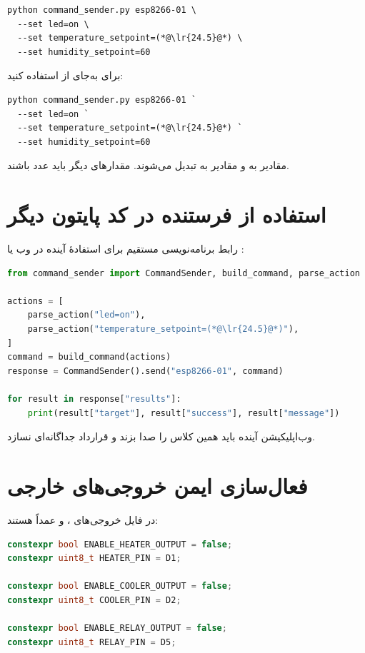 \begin{LTR}
\begin{lstlisting}
python command_sender.py esp8266-01 \
  --set led=on \
  --set temperature_setpoint=(*@\lr{24.5}@*) \
  --set humidity_setpoint=60
\end{lstlisting}
\end{LTR}

برای
به‌جای
از
استفاده کنید:

\begin{LTR}
\begin{lstlisting}
python command_sender.py esp8266-01 `
  --set led=on `
  --set temperature_setpoint=(*@\lr{24.5}@*) `
  --set humidity_setpoint=60
\end{lstlisting}
\end{LTR}

مقادیر
به
و مقادیر
به
تبدیل می‌شوند. مقدارهای دیگر باید عدد باشند.

\section{استفاده از فرستنده در کد پایتون دیگر}
رابط برنامه‌نویسی مستقیم برای استفادهٔ آینده در وب یا
:

\begin{LTR}
\begin{lstlisting}[language=Python]
from command_sender import CommandSender, build_command, parse_action

actions = [
    parse_action("led=on"),
    parse_action("temperature_setpoint=(*@\lr{24.5}@*)"),
]
command = build_command(actions)
response = CommandSender().send("esp8266-01", command)

for result in response["results"]:
    print(result["target"], result["success"], result["message"])
\end{lstlisting}
\end{LTR}

وب‌اپلیکیشن آینده باید همین کلاس را صدا بزند و قرارداد جداگانه‌ای نسازد.

\section{فعال‌سازی ایمن خروجی‌های خارجی}
در فایل
خروجی‌های
،
و
عمداً
هستند:

\begin{LTR}
\begin{lstlisting}[language=C++]
constexpr bool ENABLE_HEATER_OUTPUT = false;
constexpr uint8_t HEATER_PIN = D1;

constexpr bool ENABLE_COOLER_OUTPUT = false;
constexpr uint8_t COOLER_PIN = D2;

constexpr bool ENABLE_RELAY_OUTPUT = false;
constexpr uint8_t RELAY_PIN = D5;
\end{lstlisting}
\end{LTR}

